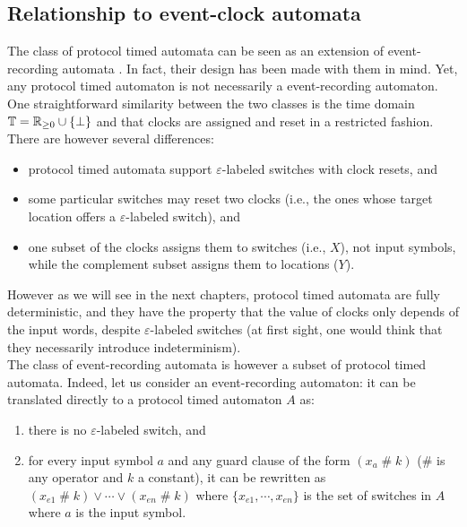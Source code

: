 
\subsection{Relationship to event-clock automata}


The class of protocol timed automata can be seen as an extension of event-recording automata \cite{RALF94}. In fact, their design has been made with them in mind. Yet, any protocol timed automaton is not necessarily a event-recording automaton. One straightforward similarity between the two classes is the time domain $\mathbb{T} = \mathbb{R}_{\geq 0} \cup \{ \perp \}$ and that clocks are assigned and reset in a restricted fashion. There are however several differences:
\begin{itemize}
  
  \item protocol timed automata support $\varepsilon$-labeled switches with clock resets, and
  
  \item some particular switches may reset two clocks (i.e., the ones whose target location offers a $\varepsilon$-labeled switch), and
  
  \item one subset of the clocks assigns them to switches (i.e., $X$), not input symbols, while the complement subset assigns them to locations ($Y$).
  
\end{itemize}

However as we will see in the next chapters, protocol timed automata are fully deterministic, and they have the property that the value of clocks only depends of the input words, despite $\varepsilon$-labeled switches (at first sight, one would think that they necessarily introduce indeterminism).\\

The class of event-recording automata is however a subset of protocol timed automata. Indeed, let us consider an event-recording automaton: it can be translated directly to a protocol timed automaton $A$ as:
\begin{enumerate}
  
  \item there is no $\varepsilon$-labeled switch, and
  
  \item for every input symbol $a$ and any guard clause of the form $(x_a \;\#\; k)$ ($\#$ is any operator and $k$ a constant), it can be rewritten as $(x_{e1} \;\#\; k) \vee \cdots \vee (x_{en} \;\#\; k)$ where $\{ x_{e1}, \cdots, x_{en} \}$ is the set of switches in $A$ where $a$ is the input symbol.
  
\end{enumerate}

